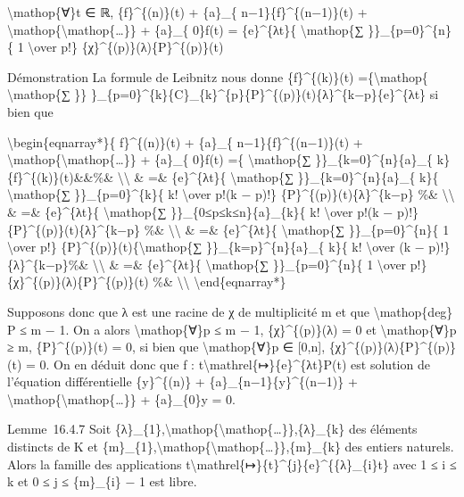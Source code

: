 \documentclass[]{article}
\begin{document}
\textbackslash{}mathop\{∀\}t ∈ ℝ, \{f\}\^{}\{(n)\}(t) + \{a\}\_\{
n−1\}\{f\}\^{}\{(n−1)\}(t) +
\textbackslash{}mathop\{\textbackslash{}mathop\{\ldots{}\}\} + \{a\}\_\{
0\}f(t) = \{e\}\^{}\{λt\}\{ \textbackslash{}mathop\{∑
\}\}\_\{p=0\}\^{}\{n\}\{ 1 \textbackslash{}over p!\}
\{χ\}\^{}\{(p)\}(λ)\{P\}\^{}\{(p)\}(t)

Démonstration La formule de Leibnitz nous donne \{f\}\^{}\{(k)\}(t)
=\{\textbackslash{}mathop\{ \textbackslash{}mathop\{∑ \}\}
\}\_\{p=0\}\^{}\{k\}\{C\}\_\{k\}\^{}\{p\}\{P\}\^{}\{(p)\}(t)\{λ\}\^{}\{k−p\}\{e\}\^{}\{λt\}
si bien que

\textbackslash{}begin\{eqnarray*\}\{ f\}\^{}\{(n)\}(t) + \{a\}\_\{
n−1\}\{f\}\^{}\{(n−1)\}(t) +
\textbackslash{}mathop\{\textbackslash{}mathop\{\ldots{}\}\} + \{a\}\_\{
0\}f(t) =\{ \textbackslash{}mathop\{∑ \}\}\_\{k=0\}\^{}\{n\}\{a\}\_\{
k\}\{f\}\^{}\{(k)\}(t)\&\&\%\& \textbackslash{}\textbackslash{} \& =\&
\{e\}\^{}\{λt\}\{ \textbackslash{}mathop\{∑
\}\}\_\{k=0\}\^{}\{n\}\{a\}\_\{ k\}\{ \textbackslash{}mathop\{∑
\}\}\_\{p=0\}\^{}\{k\}\{ k! \textbackslash{}over p!(k − p)!\}
\{P\}\^{}\{(p)\}(t)\{λ\}\^{}\{k−p\} \%\&
\textbackslash{}\textbackslash{} \& =\& \{e\}\^{}\{λt\}\{
\textbackslash{}mathop\{∑ \}\}\_\{0≤p≤k≤n\}\{a\}\_\{k\}\{ k!
\textbackslash{}over p!(k − p)!\} \{P\}\^{}\{(p)\}(t)\{λ\}\^{}\{k−p\}
\%\& \textbackslash{}\textbackslash{} \& =\& \{e\}\^{}\{λt\}\{
\textbackslash{}mathop\{∑ \}\}\_\{p=0\}\^{}\{n\}\{ 1
\textbackslash{}over p!\} \{P\}\^{}\{(p)\}(t)\{\textbackslash{}mathop\{∑
\}\}\_\{k=p\}\^{}\{n\}\{a\}\_\{ k\}\{ k! \textbackslash{}over (k − p)!\}
\{λ\}\^{}\{k−p\}\%\& \textbackslash{}\textbackslash{} \& =\&
\{e\}\^{}\{λt\}\{ \textbackslash{}mathop\{∑ \}\}\_\{p=0\}\^{}\{n\}\{ 1
\textbackslash{}over p!\} \{χ\}\^{}\{(p)\}(λ)\{P\}\^{}\{(p)\}(t) \%\&
\textbackslash{}\textbackslash{} \textbackslash{}end\{eqnarray*\}

Supposons donc que λ est une racine de χ de multiplicité m et que
\textbackslash{}mathop\{deg\} P ≤ m − 1. On a alors
\textbackslash{}mathop\{∀\}p ≤ m − 1, \{χ\}\^{}\{(p)\}(λ) = 0 et
\textbackslash{}mathop\{∀\}p ≥ m, \{P\}\^{}\{(p)\}(t) = 0, si bien que
\textbackslash{}mathop\{∀\}p ∈ {[}0,n{]},
\{χ\}\^{}\{(p)\}(λ)\{P\}\^{}\{(p)\}(t) = 0. On en déduit donc que f :
t\textbackslash{}mathrel\{↦\}\{e\}\^{}\{λt\}P(t) est solution de
l'équation différentielle \{y\}\^{}\{(n)\} +
\{a\}\_\{n−1\}\{y\}\^{}\{(n−1)\} +
\textbackslash{}mathop\{\textbackslash{}mathop\{\ldots{}\}\} +
\{a\}\_\{0\}y = 0.

Lemme~16.4.7 Soit
\{λ\}\_\{1\},\textbackslash{}mathop\{\textbackslash{}mathop\{\ldots{}\}\},\{λ\}\_\{k\}
des éléments distincts de K et
\{m\}\_\{1\},\textbackslash{}mathop\{\textbackslash{}mathop\{\ldots{}\}\},\{m\}\_\{k\}
des entiers naturels. Alors la famille des applications
t\textbackslash{}mathrel\{↦\}\{t\}\^{}\{j\}\{e\}\^{}\{\{λ\}\_\{i\}t\}
avec 1 ≤ i ≤ k et 0 ≤ j ≤ \{m\}\_\{i\} − 1 est libre.
\end{document}

